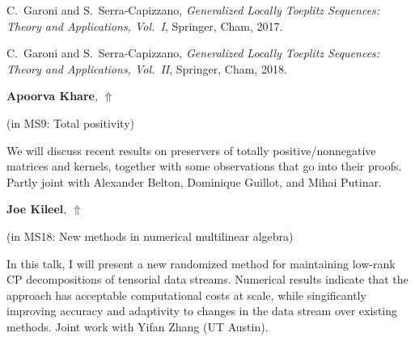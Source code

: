 \documentclass[ILAS2025-program.tex]{subfiles}
\begin{document}
\begin{ilasabstract}
\begin{bibunit}
\begin{thebibliography}{99}
C.~Garoni and S.~Serra-Capizzano,
\textit{Generalized Locally Toeplitz Sequences: Theory and Applications, Vol.~I},
Springer, Cham, 2017.

C.~Garoni and S.~Serra-Capizzano,
\textit{Generalized Locally Toeplitz Sequences: Theory and Applications, Vol.~II},
Springer, Cham, 2018.


\end{thebibliography}
        \end{bibunit}
        
\end{ilasabstract}
    

\hypertarget{down0012}{}\begin{ilasabstract}
    
\textbf{Apoorva Khare},  \hfill \hyperlink{up0012}{$\Uparrow$}
    
    
(in {\color{mstitle}MS9: Total positivity})
        
\mtskip
    We will discuss recent results on preservers of totally
positive/nonnegative matrices and kernels, together with some
observations that go into their proofs. Partly joint with Alexander
Belton, Dominique Guillot, and Mihai Putinar. 

\end{ilasabstract}
    

\hypertarget{down0189}{}\begin{ilasabstract}
    
\textbf{Joe Kileel},  \hfill \hyperlink{up0189}{$\Uparrow$}
    
    
(in {\color{mstitle}MS18: New methods in numerical multilinear algebra})
        
\mtskip
    In this talk, I will present a new randomized method for maintaining
low-rank CP decompositions of tensorial data streams.  Numerical
results indicate that the approach has acceptable computational costs
at scale, while singificantly improving accuracy and adaptivity to changes in the data stream over existing methods.  Joint work with Yifan Zhang (UT Austin).  

\end{ilasabstract}
    
\end{document}
